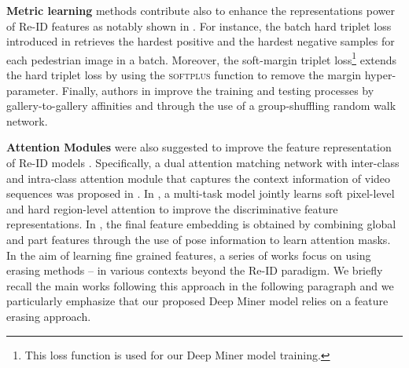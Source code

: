 \documentclass[final]{cvpr}
\begin{document}
\textbf{Metric learning} methods contribute also to enhance the representations power of Re-ID features as notably shown in \cite{chen2018group, hermans2017defense, sun2017svdnet, ristani2016performance}. For instance, the batch hard triplet loss introduced in \cite{hermans2017defense} retrieves the hardest positive and the hardest negative samples for each pedestrian image in a batch. Moreover, the soft-margin triplet loss\footnote{This loss function is used for our Deep Miner model training.} \cite{hermans2017defense} extends the hard triplet loss by using the \textsc{softplus} function to remove the margin hyper-parameter. Finally, authors in \cite{shen2018deep} improve the training and testing processes by gallery-to-gallery affinities and through the use of a group-shuffling random walk network. 

\textbf{Attention Modules} were also suggested to improve the feature representation of Re-ID models \cite{chen2019mixed, chen2019abd, hou2019interaction, tay2019aanet, si2018dual, li2018harmonious, xu2018attention}. Specifically, a dual attention matching network with inter-class and intra-class attention module that captures
the context information of video sequences was proposed in \cite{si2018dual}. In \cite{li2018harmonious}, a multi-task  model jointly learns soft pixel-level and hard region-level attention to improve the discriminative feature representations. In \cite{xu2018attention}, the final feature embedding is obtained by combining global and part features through the use of pose information to learn attention masks.\\

In the aim of learning fine grained features, a series of works focus on using erasing methods -- in various contexts beyond the Re-ID paradigm. We briefly recall the main works following this approach in the following paragraph and we particularly emphasize that our proposed Deep Miner model relies on a feature erasing approach.
\end{document}
